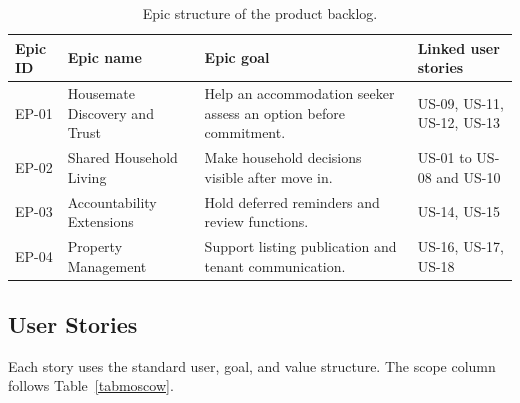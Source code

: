 \documentclass[11pt,a4paper]{article}
\begin{document}
\begin{table}[H]
    \centering
    \small
    \caption{Epic structure of the product backlog.}
    \begin{tabularx}{\textwidth}{@{}L{1.4cm}L{3.6cm}Y L{3.4cm}@{}}
        \toprule
        Epic ID & Epic name & Epic goal & Linked user stories\\
        \midrule
        EP-01 & Housemate Discovery and Trust & Help an accommodation seeker assess an option before commitment. & US-09, US-11, US-12, US-13\\
        EP-02 & Shared Household Living & Make household decisions visible after move in. & US-01 to US-08 and US-10\\
        EP-03 & Accountability Extensions & Hold deferred reminders and review functions. & US-14, US-15\\
        EP-04 & Property Management & Support listing publication and tenant communication. & US-16, US-17, US-18\\
        \bottomrule
    \end{tabularx}
    \label{tabepics}
\end{table}

\subsection{User Stories}

Each story uses the standard user, goal, and value structure. The scope column follows Table~\ref{tabmoscow}.
\end{document}

